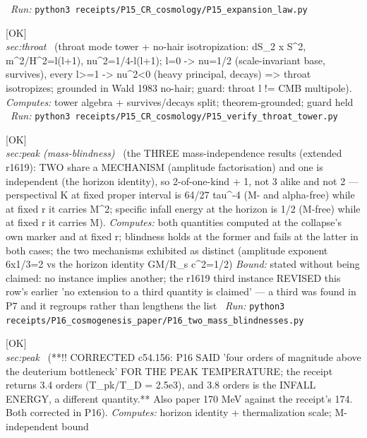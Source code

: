 \begin{description}
\ \emph{Run:} \texttt{python3 receipts/P15\_CR\_cosmology/P15\_expansion\_law.py}
\item[\label{rcpt:P15_verify_throat_tower}\texttt{P15\_verify\_throat\_tower}]\hfill\textsf{[OK]}\\
\textit{sec:throat} \ (throat mode tower + no-hair isotropization: dS\_2 x S\textasciicircum{}2, m\textasciicircum{}2/H\textasciicircum{}2=l(l+1), nu\textasciicircum{}2=1/4-l(l+1); l=0 -> nu=1/2 (scale-invariant base, survives), every l>=1 -> nu\textasciicircum{}2<0 (heavy principal, decays) => throat isotropizes; grounded in Wald 1983 no-hair; guard: throat l != CMB multipole). 
\emph{Computes:} tower algebra + survives/decays split; theorem-grounded; guard held
\ \emph{Run:} \texttt{python3 receipts/P15\_CR\_cosmology/P15\_verify\_throat\_tower.py}
\item[\label{rcpt:P16_two_mass_blindnesses}\texttt{P16\_two\_mass\_blindnesses}]\hfill\textsf{[OK]}\\
\textit{sec:peak (mass-blindness)} \ (the THREE mass-independence results (extended r1619): TWO share a MECHANISM (amplitude factorisation) and one is independent (the horizon identity), so 2-of-one-kind + 1, not 3 alike and not 2 --- perspectival K at fixed proper interval is 64/27 tau\textasciicircum{}-4 (M- and alpha-free) while at fixed r it carries M\textasciicircum{}2; specific infall energy at the horizon is 1/2 (M-free) while at fixed r it carries M). 
\emph{Computes:} both quantities computed at the collapse's own marker and at fixed r; blindness holds at the former and fails at the latter in both cases; the two mechanisms exhibited as distinct (amplitude exponent 6x1/3=2 vs the horizon identity GM/R\_s c\textasciicircum{}2=1/2)
 \emph{Bound:} stated without being claimed: no instance implies another; the r1619 third instance REVISED this row's earlier 'no extension to a third quantity is claimed' --- a third was found in P7 and it regroups rather than lengthens the list
\ \emph{Run:} \texttt{python3 receipts/P16\_cosmogenesis\_paper/P16\_two\_mass\_blindnesses.py}
\item[\label{rcpt:P16_peak_temperature}\texttt{P16\_peak\_temperature}]\hfill\textsf{[OK]}\\
\textit{sec:peak} \ (**!! CORRECTED c54.156: P16 SAID 'four orders of magnitude above the deuterium bottleneck' FOR THE PEAK TEMPERATURE; the receipt returns 3.4 orders (T\_pk/T\_D = 2.5e3), and 3.8 orders is the INFALL ENERGY, a different quantity.** Also paper 170 MeV against the receipt's 174. Both corrected in P16). 
\emph{Computes:} horizon identity + thermalization scale; M-independent bound

\end{description}
